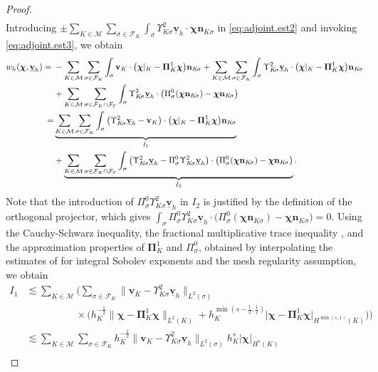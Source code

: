 \documentclass[a4paper,11pt]{article}
\theoremstyle{definition}
\theoremstyle{remark}
\newcommand{\uvec}[1]{\underline{\mathbf{#1}}}
\newcommand{\bo}[1]{\mathbf{#1}}
\newcommand{\bos}[1]{\boldsymbol{#1}}
\newcommand{\up}[1]{\Upsilon^2_{#1}}
\def\cF{\mathcal{F}}
\def\cM{\mathcal{M}}
\def\bc{\bos{\chi}}
\def\Ksig{{K\!\sigma}}
\begin{document}
\begin{proof}
\begin{equation}
\begin{aligned}
\end{aligned}
\end{equation}
Introducing $\pm \sum_{K\in\cM}\sum_{\sigma\in\cF_K}\int_{\sigma}\up{\Ksig}{\uvec{v}_h}\cdot \bc\bo{n}_{\Ksig}$ in \eqref{eq:adjoint.est2} and invoking \eqref{eq:adjoint.est3}, we obtain
\begin{align}\label{eq:adjoint.est4}
w_h(\bos{\chi},\uvec{v}_h)={}&-\sum_{K\in\cM}\sum_{\sigma\in\cF_K}\int_\sigma \bo{v}_K\cdot \big(\bc|_K-\bos{\Pi}^1_K\bc\big)\bo{n}_{\Ksig}+\sum_{K\in\cM}\sum_{\sigma\in\cF_K}\int_{\sigma}\up{\Ksig}{\uvec{v}_h}\cdot \big(\bc|_K-\bos{\Pi}^1_K\bc\big)\bo{n}_{\Ksig}\notag\\
&+\sum_{K\in\cM}\sum_{\sigma\in{\cF_K\cap\cF_\Gamma}}\int_{\sigma}\up{\Ksig}{\uvec{v}_h}\cdot\big({\Pi}^0_{\sigma}(\bc\bo{n}_{\Ksig})-\bc\bo{n}_{\Ksig}\big)\notag\\
=& \underbrace{\sum_{K\in\cM}\sum_{\sigma\in\cF_K}\int_\sigma \big(\up{\Ksig}\uvec{v}_h-\bo{v}_K\big)\cdot \big(\bc|_K-\bos{\Pi}^1_K\bc\big)\bo{n}_{\Ksig}}_{I_1}\notag\\
&+\underbrace{\sum_{K\in\cM}\sum_{\sigma\in{\cF_K\cap\cF_\Gamma}}\int_{\sigma}\big(\up{\Ksig}{\uvec{v}_h}-\Pi^0_\sigma\up{\Ksig}\uvec{v}_h\big)\cdot\big( {\Pi}^0_{\sigma}(\bc\bo{n}_{\Ksig})-\bc\bo{n}_{\Ksig}\big)}_{I_2}.
\end{align}
Note that the introduction of $\Pi^0_\sigma\up{\Ksig}\uvec{v}_h$ in $I_2$ is justified by the definition of the orthogonal projector, which gives $\int_{\sigma}\Pi^0_\sigma\up{\Ksig}\uvec{v}_h\cdot\big( {\Pi}^0_{\sigma}(\bc\bo{n}_{\Ksig})-\bc\bo{n}_{\Ksig}\big)=0$. Using the Cauchy-Schwarz inequality, the fractional multiplicative trace inequality \cite[Remark $2.6$]{erndongbiharmonic},  and the approximation properties of $\bos{\Pi}^1_K$ and ${\Pi}^0_\sigma$, obtained by interpolating the estimates of \cite[Theorem 1.45]{hho-book} for integral Sobolev exponents and the mesh regularity assumption, we obtain
\begin{align*}
I_1&\lesssim  \sum_{K\in\cM}\bigg(\sum_{\sigma\in\cF_K}\lVert \bo{v}_K-\up{\Ksig}\uvec{v}_h\rVert_{L^2(\sigma)}\\
&\qquad\quad\qquad\times \big(h^{-\frac{1}{2}}_K\lVert \bc-\bos{\Pi}^1_K\bc\rVert_{L^2(K)}
+h^{\min(s-\frac{1}{2},\frac{1}{2})}_K\lvert \bc-\bos{\Pi}^1_K\bc\rvert_{H^{\min(s,1)}(K)}\big)\bigg)\\
&\lesssim\sum_{K\in\cM}\sum_{\sigma\in\cF_K}h^{-\frac{1}{2}}_K\lVert \bo{v}_K-\up{\Ksig}\uvec{v}_h\rVert_{L^2(\sigma)}h^s_K \lvert\bc\rvert_{H^s(K)}\\ 

\end{align*}
\end{proof}
\end{document}
